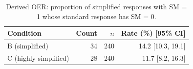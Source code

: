 \begin{table}[H]
\caption{Derived OER: proportion of simplified responses with SM = 1 whose standard response has SM = 0.}
\label{tab:oer:derived}
\centering
\begin{tabular}{lrrr}
\toprule
Condition & Count & $n$ & Rate (\%) [95\% CI] \\
\midrule
B (simplified) & 34 & 240 & 14.2 [10.3, 19.1] \\
C (highly simplified) & 28 & 240 & 11.7 [8.2, 16.3] \\
\bottomrule
\end{tabular}
\end{table}
